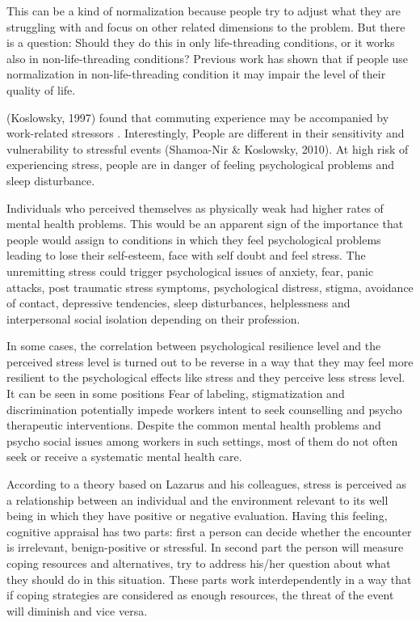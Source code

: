 \documentclass[
11pt, %
oneside, %
english, %
singlespacing, %
]{macthesis} %
\begin{document}
This can be a kind of normalization because people try to adjust what they are struggling with and focus on other related dimensions to the problem. But there is a question: Should they do this in only life-threading conditions, or it works also in non-life-threading conditions? Previous work has shown that if people use normalization in non-life-threading condition it may impair the level of their quality of life.

(Koslowsky, 1997) found that commuting experience may be accompanied by work-related stressors . Interestingly, People are different in their sensitivity and vulnerability to stressful events (Shamoa-Nir \& Koslowsky, 2010). At high risk of experiencing stress, people are in danger of feeling psychological problems and sleep disturbance.

Individuals who perceived themselves as physically weak had higher rates of mental health problems. This would be an apparent sign of the importance that people would assign to conditions in which they feel psychological problems leading to lose their self-esteem, face with self doubt and feel stress. The unremitting stress could trigger psychological issues of anxiety, fear, panic attacks, post traumatic stress symptoms, psychological distress, stigma, avoidance of contact, depressive tendencies, sleep disturbances, helplessness and interpersonal social isolation depending on their profession.

In some cases, the correlation between psychological resilience level and the perceived stress level is turned out to be reverse in a way that they may feel more resilient to the psychological effects like stress and they perceive less stress level. It can be seen in some positions Fear of labeling, stigmatization and discrimination potentially impede workers intent to seek counselling and psycho therapeutic interventions. Despite the common mental health problems and psycho social issues among workers in such settings, most of them do not often seek or receive a systematic mental health care.

According to a theory based on Lazarus and his colleagues, stress is perceived as a relationship between an individual and the environment relevant to its well being in which they have positive or negative evaluation. Having this feeling, cognitive appraisal has two parts: first a person can decide whether the encounter is irrelevant, benign-positive or stressful. In second part the person will measure coping resources and alternatives, try to address his/her question about what they should do in this situation. These parts work interdependently in a way that if coping strategies are considered as enough resources, the threat of the event will diminish and vice versa.
\end{document}
